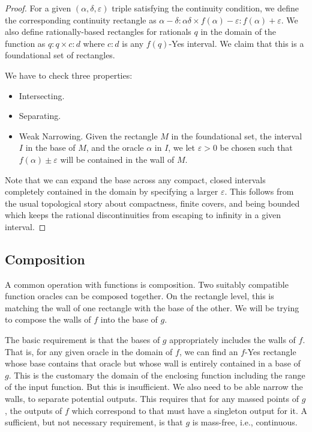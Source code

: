 \documentclass[12pt]{article}
\begin{document}
\begin{proof}
    For a given $(\alpha, \delta, \varepsilon)$ triple satisfying the continuity condition, we define the corresponding continuity rectangle as $\alpha-\delta : \alpha \delta \times f(\alpha)-\varepsilon: f(\alpha)+\varepsilon$. We also define rationally-based rectangles for rationals $q$ in the domain of the function as $q:q \times c:d$ where $c:d$ is any $f(q)$-Yes interval. We claim that this is a foundational set of rectangles. 

    We have to check three properties:

    \begin{itemize}
        \item Intersecting. 
        \item Separating. 
        \item Weak Narrowing. Given the rectangle $M$ in the foundational set, the interval $I$ in the base of $M$, and the oracle $\alpha$ in $I$, we let $\varepsilon > 0$ be chosen such that $f(\alpha)\pm \varepsilon$ will be contained in the wall of $M$. 
    \end{itemize}

    Note that we can expand the base across any compact, closed intervals completely contained in the domain by specifying a larger $\varepsilon$. This follows from the usual topological story about compactness, finite covers, and being bounded which keeps the rational discontinuities from escaping to infinity in a given interval. 
    
\end{proof}

\subsection{Composition}

A common operation with functions is composition. Two suitably compatible function oracles can be composed together. On the rectangle level, this is matching the wall of one rectangle with the base of the other. We will be trying to compose the walls of $f$ into the base of $g$.

The basic requirement is that the bases of $g$ appropriately includes the walls of $f$. That is, for any given oracle in the domain of $f$, we can find an $f$-Yes rectangle whose base contains that oracle but whose wall is entirely contained in a base of $g$. This is the customary the domain of the enclosing function including the range of the input function. But this is insufficient. We also need to be able narrow the walls, to separate potential outputs. This requires that for any massed points of $g$, the outputs of $f$ which correspond to that must have a singleton output for it. A sufficient, but not necessary requirement, is that $g$ is mass-free, i.e., continuous. 
\end{document}
